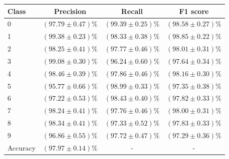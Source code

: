 \begin{tabular}{l|c|c|c}
\hline
Class &  Precision & Recall & F1 score \\
\hline
0 & $(97.79 \pm 0.47)\%$ & $(99.39 \pm 0.25)\%$ & $(98.58 \pm 0.27)\%$ \\
1 & $(99.38 \pm 0.23)\%$ & $(98.33 \pm 0.38)\%$ & $(98.85 \pm 0.22)\%$ \\
2 & $(98.25 \pm 0.41)\%$ & $(97.77 \pm 0.46)\%$ & $(98.01 \pm 0.31)\%$ \\
3 & $(99.08 \pm 0.30)\%$ & $(96.24 \pm 0.60)\%$ & $(97.64 \pm 0.34)\%$ \\
4 & $(98.46 \pm 0.39)\%$ & $(97.86 \pm 0.46)\%$ & $(98.16 \pm 0.30)\%$ \\
5 & $(95.77 \pm 0.66)\%$ & $(98.99 \pm 0.33)\%$ & $(97.35 \pm 0.38)\%$ \\
6 & $(97.22 \pm 0.53)\%$ & $(98.43 \pm 0.40)\%$ & $(97.82 \pm 0.33)\%$ \\
7 & $(98.24 \pm 0.41)\%$ & $(97.76 \pm 0.46)\%$ & $(98.00 \pm 0.31)\%$ \\
8 & $(98.34 \pm 0.41)\%$ & $(97.33 \pm 0.52)\%$ & $(97.83 \pm 0.33)\%$ \\
9 & $(96.86 \pm 0.55)\%$ & $(97.72 \pm 0.47)\%$ & $(97.29 \pm 0.36)\%$ \\
\hline
Accuracy & $(97.97 \pm 0.14)\%$ & - & - \\
\hline
\end{tabular}
